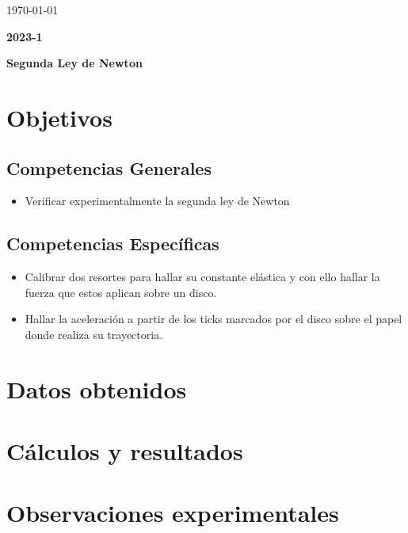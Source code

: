 \documentclass[10pt]{article}
\begin{document}
\begin{center}
\large{\today}\\
\vspace{0.5cm}

{ \Large\bfseries 2023-1}
										 			
\end{center}							 											
																					
\newpage																		

\tableofcontents 

\newpage

\begin{center}
    \textbf{\huge Segunda Ley de Newton}
\end{center}

\section{Objetivos}
\subsection{Competencias Generales}
\begin{itemize}
    \item Verificar experimentalmente la segunda ley de Newton
\end{itemize} 
\subsection{Competencias Específicas}
\begin{itemize}
    \item Calibrar dos resortes para hallar su constante elástica y con ello hallar la fuerza que estos aplican sobre un disco.
    \item Hallar la aceleración a partir de los ticks marcados por el disco sobre el papel donde realiza su trayectoria.
\end{itemize}

\section{Datos obtenidos}

\newpage

\section{Cálculos y resultados}


\section{Observaciones experimentales}
\end{document}
